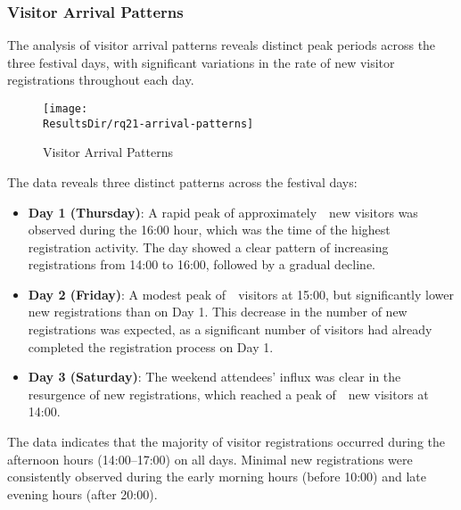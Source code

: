 
\subsubsection{Visitor Arrival Patterns}
\label{subsubsec:analysis-visitor-patterns}


The analysis of visitor arrival patterns reveals distinct peak periods across the three festival days, with significant variations in the rate of new visitor registrations throughout each day.

\begin{figure}[H]
	\centering
	\texttt{[image: \\ResultsDir/rq21-arrival-patterns]}
	\caption{Visitor Arrival Patterns}
	\label{fig:visitor-arrival-patterns}
	\source
\end{figure}

The data reveals three distinct patterns across the festival days:

\begin{itemize}
	\item \textbf{Day 1 (Thursday)}: A rapid peak of approximately~~new visitors was observed during the 16:00 hour, which was the time of the highest registration activity.
	\subitem The day showed a clear pattern of increasing registrations from 14:00 to 16:00, followed by a gradual decline.
	\item \textbf{Day 2 (Friday)}: A modest peak of~~visitors at 15:00, but significantly lower new registrations than on Day 1.
	\subitem This decrease in the number of new registrations was expected, as a significant number of visitors had already completed the registration process on Day 1.
	\item \textbf{Day 3 (Saturday)}: The weekend attendees' influx was clear in the resurgence of new registrations, which reached a peak of~~new visitors at 14:00.
\end{itemize}

The data indicates that the majority of visitor registrations occurred during the afternoon hours (14:00–17:00) on all days.
Minimal new registrations were consistently observed during the early morning hours (before 10:00) and late evening hours (after 20:00).

